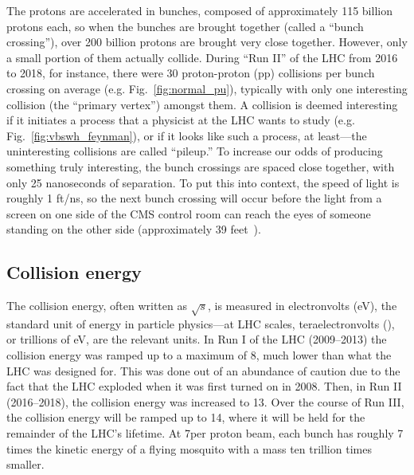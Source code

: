 The protons are accelerated in bunches, composed of approximately 115 billion protons each, so when the bunches are brought together (called a ``bunch crossing''), over 200 billion protons are brought very close together.
However, only a small portion of them actually collide. 
During ``Run II'' of the LHC from 2016 to 2018, for instance, there were 30 proton-proton (pp) collisions per bunch crossing on average (e.g. Fig.~\ref{fig:normal_pu}), typically with only one interesting collision (the ``primary vertex'') amongst them. 
A collision is deemed interesting if it initiates a process that a physicist at the LHC wants to study (e.g. Fig.~\ref{fig:vbswh_feynman}), or if it looks like such a process, at least---the uninteresting collisions are called ``pileup.'' 
To increase our odds of producing something truly interesting, the bunch crossings are spaced close together, with only 25 nanoseconds of separation. 
To put this into context, the speed of light is roughly 1 ft/ns, so the next bunch crossing will occur before the light from a screen on one side of the CMS control room can reach the eyes of someone standing on the other side (approximately 39 feet~\cite{CMSP5Layout}).

\subsection{Collision energy}
The collision energy, often written as $\sqrt{s}$, is measured in electronvolts (eV), the standard unit of energy in particle physics---at LHC scales, teraelectronvolts (\TeVns), or trillions of eV, are the relevant units. 
In Run I of the LHC (2009--2013) the collision energy was ramped up to a maximum of 8\TeV, much lower than what the LHC was designed for. %
This was done out of an abundance of caution due to the fact that the LHC exploded when it was first turned on in 2008. %
Then, in Run II (2016--2018), the collision energy was increased to 13\TeV. 
Over the course of Run III, the collision energy will be ramped up to 14\TeV, where it will be held for the remainder of the LHC's lifetime. 
At 7\TeV per proton beam, each bunch has roughly 7 times the kinetic energy of a flying mosquito with a mass ten trillion times smaller. 

